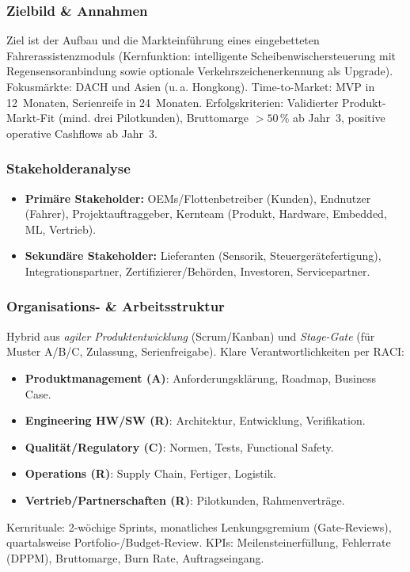 \documentclass[
%
ngerman %
%
numeric %
]{wbh-assignment}
\begin{document}
\vspace*{5mm}

\subsubsection{Zielbild \& Annahmen}
Ziel ist der Aufbau und die Markteinführung eines eingebetteten Fahrerassistenzmoduls (Kernfunktion: intelligente Scheibenwischersteuerung mit Regensensoranbindung sowie optionale Verkehrszeichenerkennung als Upgrade). Fokusmärkte: DACH und Asien (u.\,a. Hongkong). Time-to-Market: MVP in 12~Monaten, Serienreife in 24~Monaten. Erfolgskriterien: Validierter Produkt-Markt-Fit (mind. drei Pilotkunden), Bruttomarge $>50\,\%$ ab Jahr~3, positive operative Cashflows ab Jahr~3.

\subsubsection{Stakeholderanalyse}
\begin{itemize}
  \item \textbf{Primäre Stakeholder:} OEMs/Flottenbetreiber (Kunden), Endnutzer (Fahrer), Projektauftraggeber, Kernteam (Produkt, Hardware, Embedded, ML, Vertrieb).
  \item \textbf{Sekundäre Stakeholder:} Lieferanten (Sensorik, Steuergerätefertigung), Integrationspartner, Zertifizierer/Behörden, Investoren, Servicepartner.
\end{itemize}

\subsubsection{Organisations- \& Arbeitsstruktur}
Hybrid aus \emph{agiler Produktentwicklung} (Scrum/Kanban) und \emph{Stage-Gate} (für Muster A/B/C, Zulassung, Serienfreigabe). Klare Verantwortlichkeiten per RACI:
\begin{itemize}
  \item \textbf{Produktmanagement (A)}: Anforderungsklärung, Roadmap, Business Case.
  \item \textbf{Engineering HW/SW (R)}: Architektur, Entwicklung, Verifikation.
  \item \textbf{Qualität/Regulatory (C)}: Normen, Tests, Functional Safety.
  \item \textbf{Operations (R)}: Supply Chain, Fertiger, Logistik.
  \item \textbf{Vertrieb/Partnerschaften (R)}: Pilotkunden, Rahmenverträge.
\end{itemize}
Kernrituale: 2-wöchige Sprints, monatliches Lenkungsgremium (Gate-Reviews), quartalsweise Portfolio-/Budget-Review. KPIs: Meilensteinerfüllung, Fehlerrate (DPPM), Bruttomarge, Burn Rate, Auftragseingang.
\end{document}
